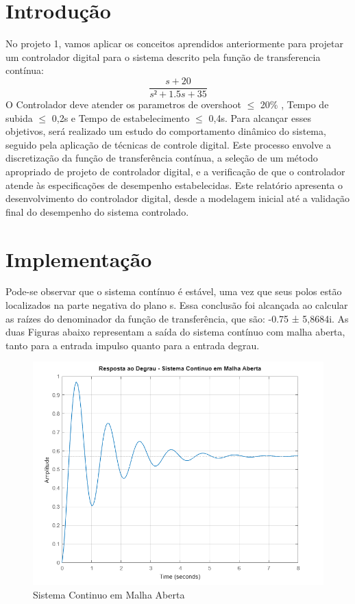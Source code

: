 \documentclass[a4paper, 12pt]{article}
\begin{document}
\newpage
\newpage
\tableofcontents
\thispagestyle{empty}

\newpage
{}
\section{Introdução}
    No projeto 1, vamos aplicar os conceitos aprendidos anteriormente para projetar um controlador digital para o sistema descrito pela função de transferencia contínua: 
    \begin{equation}
    \frac{s+20}{s²+1.5s+35}
    \end{equation}
    O Controlador deve atender os parametros de overshoot  $\leq$ 20\% , Tempo de subida $\leq$ 0,2s
    e Tempo de estabelecimento  $\leq$ 0,4s.
    Para alcançar esses objetivos, será realizado um estudo do comportamento dinâmico do sistema, seguido pela aplicação de técnicas de controle digital. Este processo envolve a discretização da função de transferência contínua, a seleção de um método apropriado de projeto de controlador digital, e a verificação de que o controlador atende às especificações de desempenho estabelecidas. Este relatório apresenta o desenvolvimento do controlador digital, desde a modelagem inicial até a validação final do desempenho do sistema controlado.
    
\section{Implementação}
    Pode-se observar que o sistema contínuo é estável, uma vez que seus polos estão localizados na parte negativa do plano s. Essa conclusão foi alcançada ao calcular as raízes do denominador da função de transferência, que são: -0.75 ± 5,8684i. As duas Figuras abaixo representam a saída do sistema contínuo com malha aberta, tanto para a entrada impulso quanto para a entrada degrau.

\begin{figure}[H]
    \centering
    \includegraphics[width=0.9\linewidth]{qqqqq.png}
    \caption{Sistema Continuo em Malha Aberta}
    \label{fig:enter-label}
\end{figure}
\end{document}
